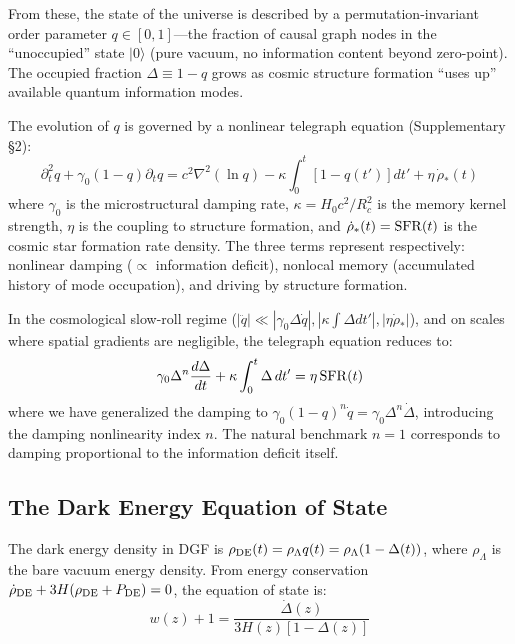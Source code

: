 \documentclass[12pt,a4paper]{article}
\begin{document}
From these, the state of the universe is described by a permutation-invariant order parameter $q\in[0,1]$---the fraction of causal graph nodes in the ``unoccupied'' state $|0\rangle$ (pure vacuum, no information content beyond zero-point). The occupied fraction $\Delta\equiv1-q$ grows as cosmic structure formation ``uses up'' available quantum information modes.

The evolution of $q$ is governed by a nonlinear telegraph equation (Supplementary \S2):
\begin{equation}\label{eq:telegraph}
\partial_t^2 q + \gamma_0(1-q)\partial_t q = c^2\nabla^2(\ln q) - \kappa\int_0^t [1-q(t')]dt' + \eta\,\dot{\rho}_*(t)
\end{equation}
where $\gamma_0$ is the microstructural damping rate, $\kappa=H_0c^2/R_c^2$ is the memory kernel strength, $\eta$ is the coupling to structure formation, and $\dot{\rho}_*(t)={\rm SFR}(t)$ is the cosmic star formation rate density. The three terms represent respectively: nonlinear damping ($\propto$ information deficit), nonlocal memory (accumulated history of mode occupation), and driving by structure formation.

In the cosmological slow-roll regime ($|\ddot{q}|\ll|\gamma_0\Delta\dot{q}|,|\kappa\int\Delta dt'|,|\eta\dot{\rho}_*|$), and on scales where spatial gradients are negligible, the telegraph equation reduces to:
\begin{equation}\label{eq:slowroll}
\gamma_0\Delta^n\frac{d\Delta}{dt} + \kappa\int_0^t\Delta\,dt' = \eta\,{\rm SFR}(t)
\end{equation}
where we have generalized the damping to $\gamma_0(1-q)^n\dot{q}=\gamma_0\Delta^n\dot{\Delta}$, introducing the damping nonlinearity index $n$. The natural benchmark $n=1$ corresponds to damping proportional to the information deficit itself.

\subsection{The Dark Energy Equation of State}

The dark energy density in DGF is $\rho_{\rm DE}(t)=\rho_\Lambda q(t)=\rho_\Lambda(1-\Delta(t))$, where $\rho_\Lambda$ is the bare vacuum energy density. From energy conservation $\dot{\rho}_{\rm DE}+3H(\rho_{\rm DE}+P_{\rm DE})=0$, the equation of state is:
\begin{equation}\label{eq:w}
w(z)+1 = \frac{\dot{\Delta}(z)}{3H(z)[1-\Delta(z)]}
\end{equation}
\end{document}
